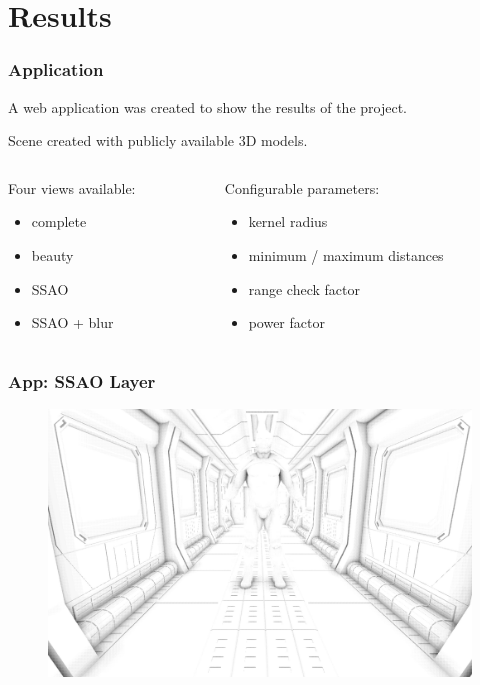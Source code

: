 \documentclass{beamer}
\begin{document}
\section{Results}

\begin{frame}
\frametitle{Application}
A web application was created to show the results of the project.

Scene created with publicly available 3D models.
\vspace{0.6cm}
\begin{columns}
    \begin{column}[t]{0.45\linewidth}
        Four views available:
        \begin{itemize}
            \item complete
            \item beauty
            \item SSAO
            \item SSAO + blur
        \end{itemize}
    \end{column}

    \begin{column}[t]{0.45\linewidth}
        Configurable parameters:
        \begin{itemize}
            \item kernel radius
            \item minimum / maximum distances
            \item range check factor
            \item power factor
        \end{itemize}
    \end{column}

\end{columns}

\end{frame}

\newcommand{\resultwidth}{0.9\linewidth}

\begin{frame}
\frametitle{App: SSAO Layer}
\begin{figure}
    \centering
    \includegraphics[width=\resultwidth]{images/app_ssao}
\end{figure}

\end{frame}
\end{document}

